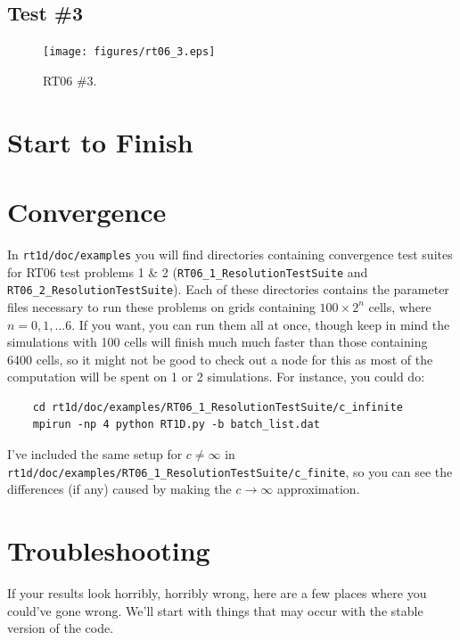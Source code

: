 \documentclass[letterpaper,titlepage,12pt]{article}
\numberwithin{equation}{section}
\begin{document}
\subsection{Test \#3}

\begin{figure}[htbp!]
\begin{center}
\texttt{[image: figures/rt06\_3.eps]}
\caption{RT06 \#3.}
\label{fig:RT06_3}
\end{center}
\end{figure}

\section{Start to Finish}

\section{Convergence}
In \texttt{rt1d/doc/examples} you will find directories containing convergence test suites for RT06 test problems 1 \& 2 (\texttt{RT06\_1\_ResolutionTestSuite} and \texttt{RT06\_2\_ResolutionTestSuite}).  Each of these directories contains the parameter files necessary to run these problems on grids containing $100 \times 2^n$ cells, where $n = 0,1,...6$.  If you want, you can run them all at once, though keep in mind the simulations with 100 cells will finish much much faster than those containing 6400 cells, so it might not be good to check out a node for this as most of the computation will be spent on 1 or 2 simulations.  For instance, you could do:
\begin{verbatim}
    cd rt1d/doc/examples/RT06_1_ResolutionTestSuite/c_infinite
    mpirun -np 4 python RT1D.py -b batch_list.dat
\end{verbatim}
I've included the same setup for $c \neq \infty$ in \texttt{rt1d/doc/examples/RT06\_1\_ResolutionTestSuite/c\_finite}, so you can see the differences (if any) caused by making the $c \rightarrow \infty$ approximation.

\section{Troubleshooting}
If your results look horribly, horribly wrong, here are a few places where you could've gone wrong.  We'll start with things that may occur with the stable version of the code.
\end{document}
